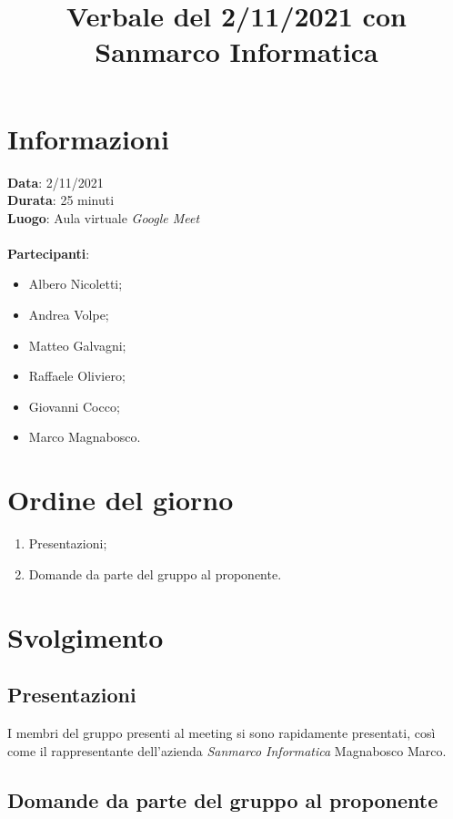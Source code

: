 \documentclass[a4paper,12pt]{article}
\author{}
\date{}
\begin{document}
\title{Verbale del 2/11/2021 con Sanmarco Informatica}
\maketitle

\section{Informazioni}
\textbf{Data}: 2/11/2021\\
\textbf{Durata}: 25 minuti\\
\textbf{Luogo}: Aula virtuale \textit{Google Meet}\\\\
\textbf{Partecipanti}:
\begin{itemize}
	\item Albero Nicoletti;
	\item Andrea Volpe;
	\item Matteo Galvagni;
	\item Raffaele Oliviero;
    \item Giovanni Cocco;
    \item Marco Magnabosco.
\end{itemize}

\section{Ordine del giorno}
\begin{enumerate}
    \item Presentazioni;
    \item Domande da parte del gruppo al proponente.
\end{enumerate}

\section{Svolgimento}

\subsection{Presentazioni}
I membri del gruppo presenti al meeting si sono rapidamente presentati, così come il rappresentante dell'azienda \textit{Sanmarco Informatica} Magnabosco Marco.

\subsection{Domande da parte del gruppo al proponente}
\end{document}
